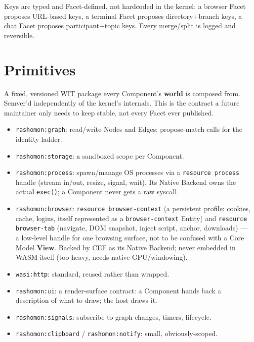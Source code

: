 \documentclass[11pt]{article}
\begin{document}
Keys are typed and Facet-defined, not hardcoded in the kernel: a browser Facet proposes URL-based keys, a terminal Facet proposes directory+branch keys, a chat Facet proposes participant+topic keys. Every merge/split is logged and reversible.
\section{Primitives}
\label{sec:orge356058}

A fixed, versioned WIT package every Component's \textbf{world} is composed from. Semver'd independently of the kernel's internals. This is the contract a future maintainer only needs to keep stable, not every Facet ever published.

\begin{itemize}
\item \texttt{rashomon:graph}: read/write Nodes and Edges; propose-match calls for the identity ladder.
\item \texttt{rashomon:storage}: a sandboxed scope per Component.
\item \texttt{rashomon:process}: spawn/manage OS processes via a \texttt{resource process} handle (stream in/out, resize, signal, wait). Its Native Backend owns the actual \texttt{exec()}; a Component never gets a raw syscall.
\item \texttt{rashomon:browser}: \texttt{resource browser-context} (a persistent profile: cookies, cache, logins, itself represented as a \texttt{browser-context} Entity) and \texttt{resource browser-tab} (navigate, DOM snapshot, inject script, anchor, downloads) — a low-level handle for one browsing surface, not to be confused with a Core Model \textbf{View}. Backed by CEF as its Native Backend; never embedded in WASM itself (too heavy, needs native GPU/windowing).
\item \texttt{wasi:http}: standard, reused rather than wrapped.
\item \texttt{rashomon:ui}: a render-surface contract: a Component hands back a description of what to draw; the host draws it.
\item \texttt{rashomon:signals}: subscribe to graph changes, timers, lifecycle.
\item \texttt{rashomon:clipboard} / \texttt{rashomon:notify}: small, obviously-scoped.
\end{itemize}
\end{document}
